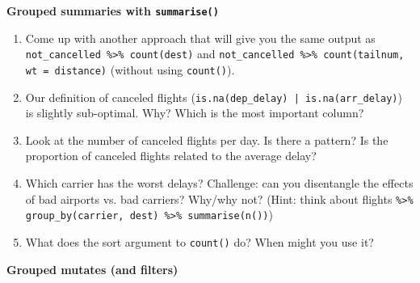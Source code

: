 \documentclass[11pt,a4paper]{article}
\begin{document}
\noindent \textbf{Grouped summaries with \texttt{summarise()}}

\begin{enumerate}
	\item Come up with another approach that will give you the same output as \texttt{not\_cancelled \%>\% count(dest)} and \texttt{not\_cancelled \%>\% count(tailnum, wt = distance)} (without using \texttt{count()}).
	
	\item Our definition of canceled flights (\texttt{is.na(dep\_delay) | is.na(arr\_delay)}) is slightly sub-optimal. Why? Which is the most important column?
	
	\item Look at the number of canceled flights per day. Is there a pattern? Is the proportion of canceled flights related to the average delay?
	
	\item Which carrier has the worst delays? Challenge: can you disentangle the effects of bad airports vs. bad carriers? Why/why not? (Hint: think about flights \texttt{\%>\% group\_by(carrier, dest) \%>\% summarise(n())})
	
	\item What does the sort argument to \texttt{count()} do? When might you use it?
	
\end{enumerate}

\noindent \textbf{Grouped mutates (and filters)}
\end{document}
